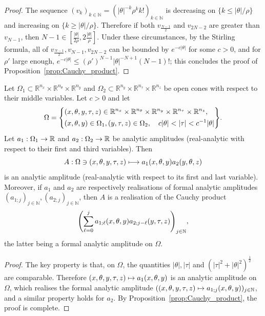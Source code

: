 \documentclass[AHL,Unicode,longabstracts,published]{cedram}
\newcommand\1{\mathds{1}}
\newcommand{\R}{\mathbb{R}}
\newcommand{\N}{\mathbb{N}}
\renewcommand*{\to}{\mathchoice{\longrightarrow}{\rightarrow}{\rightarrow}{\rightarrow}}
\let\oldmapsto\mapsto
\renewcommand*{\mapsto}{\mathchoice{\longmapsto}{\oldmapsto}{\oldmapsto}{\oldmapsto}}
\let\originalleft\left
\let\originalright\right
\renewcommand{\left}{\mathopen{}\mathclose\bgroup\originalleft}
\renewcommand{\right}{\aftergroup\egroup\originalright}
\begin{document}
\begin{proof}
The sequence $(v_k)_{k\in \N}=(|\theta|^{-k}\rho^kk!)_{k\in \N}$ is decreasing on $\{k\leq |\theta|/\rho\}$ and increasing on $\{k\geq |\theta|/\rho\}$. Therefore if both $v_{\frac{N-1}{2}}$ and $v_{2N-2}$ are greater than $v_{N-1}$, then $N-1\in [\frac{|\theta|}{2\rho},2\frac{|\theta|}{\rho}]$. Under these circumstances, by the Stirling formula, all of $v_{\frac{N-1}{2}},v_{N-1},v_{2N-2}$ can be bounded by $e^{-c|\theta|}$ for some $c>0$, and for $\rho'$ large enough, $e^{-c|\theta|}\leq (\rho')^{N-1}|\theta|^{-N+1}(N-1)!$; this concludes the proof of Proposition~\ref{prop:Cauchy_product}.
\end{proof}

\begin{prop}\label{prop:product_preparation}
Let $\Omega_1\subset \R^{n_x}\times \R^{n_{\theta}}\times
\R^{n_y}$ and $\Omega_2\subset \R^{n_y}\times \R^{n_{\tau}}\times
\R^{n_z}$ be open cones with respect to their middle variables. Let $c>0$ and let
\begin{equation*}
\Omega=\left\{
\begin{aligned}
&(x,\theta,y,\tau,z)\in \R^{n_x}\times \R^{n_{\theta}}\times
\R^{n_y}\times \R^{n_{\tau}}\times
\R^{n_z},\\ &(x,\theta,y)\in \Omega_1,(y,\tau,z)\in \Omega_2,\quad c|\theta|<|\tau|<c^{-1}|\theta|
\end{aligned}
\right\}.
\end{equation*}
Let $a_1:\Omega_1\to \R$ and $a_2:\Omega_2\to \R$ be analytic amplitudes (real-analytic with respect to their first and third variables). Then
\[
A:\Omega\ni (x,\theta,y,\tau,z)\mapsto a_1(x,\theta,y)a_2(y,\theta,z)
\]
is an analytic amplitude (real-analytic with respect to its first and last variable). Moreover, if $a_1$ and $a_2$ are respectively realisations of formal analytic amplitudes $(a_{1;j})_{j\in
\N},(a_{2;j})_{j\in \N}$, then $A$ is a realisation of the Cauchy product
\[
\left(\sum_{\ell=0}^ja_{1;\ell}(x,\theta,y)a_{2;j-\ell}(y,\tau,z)\right)_{j\in
\N},
\]
the latter being a formal analytic amplitude on $\Omega$.
\end{prop}
\begin{proof}
The key property is that, on $\Omega$, the quantities $|\theta|,|\tau|$ and $(|\tau|^2+|\theta|^2)^{\frac 12}$ are comparable. Therefore $(x,\theta,y,\tau,z)\mapsto a_1(x,\theta,y)$ is an analytic amplitude on $\Omega$, which realises the formal analytic amplitude $((x,\theta,y,\tau,z)\mapsto a_{1;j}(x,\theta,y))_{j\in \N}$, and a similar property holds for $a_2$. By Proposition~\ref{prop:Cauchy_product}, the proof is complete.
\end{proof}
\end{document}
